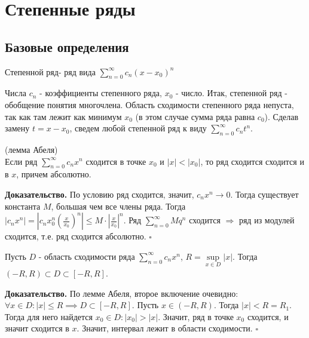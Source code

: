 \section{Степенные ряды}
\subsection{Базовые определения}
\begin{defin}
Степенной ряд- ряд вида $\sum\limits_{n=0}^{\infty} c_n(x-x_0)^n$
\end{defin}
Числа $c_n$ - коэффициенты степенного ряда,  $x_0$ - число. Итак, степенной
ряд - обобщение понятия многочлена. Область сходимости степенного ряда 
непуста, так как там лежит как минимум  $x_0$ (в этом случае сумма ряда 
равна $c_0$). Сделав замену $t=x-x_0$, сведем любой степенной ряд к виду
 $\sum\limits_{n=0}^{\infty} c_nt^n$.
\begin{theor}
    (лемма Абеля)\\
    Если ряд $\sum\limits_{n=0}^{\infty} c_nx^n$ сходится в точке $x_0$ и 
     $|x|<|x_0|$, то ряд сходится сходится и в  $x$, причем абсолютно.
\end{theor}
\textbf{Доказательство.}  По условию ряд сходится, значит,
$c_nx^n\to0$. Тогда существует константа $M$, большая чем все члены ряда. 
Тогда $|c_nx^n|=\left| c_nx_0^n \left( \frac{x}{x_0} \right)^n  \right|
\leqslant M\cdot \left| \frac{x}{x_0} \right|^n $. Ряд $\sum\limits_{n=0}^{\infty} Mq^n$ сходится $\Rightarrow$ ряд из модулей сходится, т.е. ряд 
сходится абсолютно.
$\square$ 
\begin{theor}
Пусть $D$ - область сходимости ряда  $\sum\limits_{n=0}^{\infty} c_nx^n$,
$R=\sup\limits_{x\in D} |x|$. Тогда $(-R,R)\subset D\subset [-R,R]$.
\end{theor}
\textbf{Доказательство.} 
По лемме Абеля, второе включение очевидно: $\forall x\in D:|x|\leqslant R
\implies D\subset [-R,R]$.
Пусть $x\in(-R,R)$. Тогда  $|x|<R=R_1$. Тогда 
для него найдется  $x_0\in D:|x_0|>|x|$. Значит, ряд в точке  $x_0$ сходится,
и значит сходится в  $x$. Значит, интервал лежит в области сходимости.
$\square$ 
